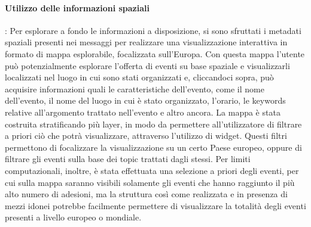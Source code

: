 \documentclass[fleqn,10pt]{SelfArx} %
\begin{document}
{\paragraph{Utilizzo delle informazioni spaziali}:
Per esplorare a fondo le informazioni a disposizione, si sono sfruttati i metadati spaziali presenti nei messaggi per realizzare una visualizzazione interattiva in formato di mappa esplorabile, focalizzata sull'Europa. 
Con questa mappa l'utente può potenzialmente esplorare l'offerta di eventi su base spaziale e visualizzarli localizzati nel luogo in cui sono stati organizzati e, cliccandoci sopra, può acquisire informazioni quali le caratteristiche dell'evento, come il nome dell'evento, il nome del luogo in cui è stato organizzato, l'orario, le keywords relative all'argomento trattato nell'evento e altro ancora. 
La mappa è stata costruita stratificando più layer, in modo da permettere all'utilizzatore di filtrare a priori ciò che potrà visualizzare, attraverso l'utilizzo di widget. 
Questi filtri permettono di focalizzare la visualizzazione su un certo Paese europeo, oppure di filtrare gli eventi sulla base dei topic trattati dagli stessi. 
Per limiti computazionali, inoltre, è stata effettuata una selezione a priori degli eventi, per cui sulla mappa saranno visibili solamente gli eventi che hanno raggiunto il più alto numero di adesioni, ma la struttura così come realizzata e in presenza di mezzi idonei potrebbe facilmente permettere di visualizzare la totalità degli eventi presenti a livello europeo o mondiale.
}
\end{document}

